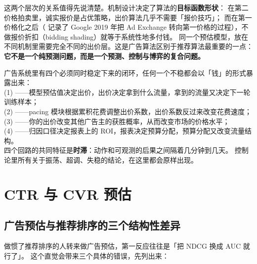 这两个层次的关系值得先说清楚。机制设计决定了算法的\textbf{目标函数形状}：
在第二价格拍卖里，诚实报价是占优策略，出价算法几乎不需要「报价技巧」；
而在第一价格化之后（\cite{krengel2019firstprice} 记录了 Google 2019 年把 Ad Exchange
转向第一价格的过程），不做报价折扣（bidding shading）就等于系统性地多付钱。
同一个预估模型，放在不同机制里需要完全不同的出价层。这是广告算法区别于推荐算法最重要的一点：
\textbf{它不是一个纯预测问题，而是一个预测、控制与博弈的复合问题。}

\begin{keypoint}[本章的四个反馈回路]
广告系统里有四个必须同时稳定下来的闭环，任何一个不稳都会以「钱」的形式暴露出来：\\
(1) ——模型预估值决定出价，出价决定拿到什么流量，拿到的流量又决定下一轮训练样本；\\
(2) ——pacing 模块根据累积花费调整出价系数，出价系数反过来改变花费速度；\\
(3) ——你的出价改变其他广告主的获胜概率，从而改变市场的价格水平；\\
(4) ——归因口径决定报表上的 ROI，报表决定预算分配，预算分配又改变流量结构。\\
四个回路的共同特征是\textbf{时滞}：动作和可观测的后果之间隔着几分钟到几天。
控制论里所有关于振荡、超调、失稳的结论，在这里都会原样出现。
\end{keypoint}

\section{CTR 与 CVR 预估}

\subsection{广告预估与推荐排序的三个结构性差异}

做惯了推荐排序的人转来做广告预估，第一反应往往是「把 NDCG 换成 AUC 就行了」。
这个直觉会带来三个具体的错误，先列出来：

